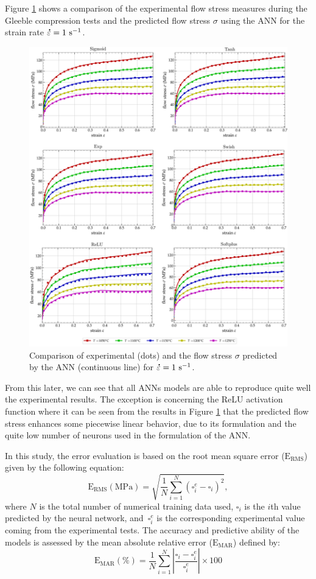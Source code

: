 \documentclass[algorithms,article,submit,pdftex,moreauthors]{Definitions/mdpi}
\DeclareRobustCommand{\mdot}[1]{\accentset{\mbox{\bfseries .}}{#1}}
\DeclareRobustCommand{\RMSE}{\text{E}_\text{RMS}}
\DeclareRobustCommand{\MARE}{\text{E}_\text{MAR}}
\DeclareRobustCommand{\ps}{\text{s}^{-1}}
\DeclareRobustCommand{\MPa}{\text{MPa}}
\begin{document}
Figure \ref{fig:ANNFit} shows a comparison of the experimental flow stress measures during the Gleeble compression tests and the predicted flow stress $\sigma$ using the ANN for the strain rate $\mdot{\varepsilon}=1~\ps$. 
\begin{figure}[h]
\centering
\includegraphics[width=0.95\columnwidth]{Figures/ANN-fit}
\caption{Comparison of experimental (dots) and the flow stress $\sigma$ predicted by the ANN (continuous line) for $\mdot{\varepsilon}=1~\ps$.}
\label{fig:ANNFit}
\end{figure}
From this later, we can see that all ANNs models are able to reproduce quite well the experimental results. The exception is concerning the ReLU activation function where it can be seen from the results in Figure \ref{fig:ANNFit} that the predicted flow stress enhances some piecewise linear behavior, due to its formulation and the quite low number of neurons used in the formulation of the ANN.

In this study, the error evaluation is based on the root mean square error ($\RMSE$) given by the following equation:
\begin{equation}
\RMSE (\MPa) = \sqrt{\frac{1}{N} \sum_{i=1}^{N} \left(\square_i^e - \square_i\right)^2}, \label{eq:RMSE}
\end{equation}
where $N$ is the total number of numerical training data used, $\square_i$ is the $i$th value predicted by the neural network, and~$\square_i^e$ is the corresponding experimental value coming from the experimental tests.
The accuracy and predictive ability of the models is assessed by the mean absolute relative error ($\MARE$) defined by:
\begin{equation}
\MARE(\%) = \frac{1}{N} \sum_{i=1}^{N}{\left|\frac{\square_i -\square_i^e}{\square_i^e}\right|} \times 100 \label{eq:AARE}
\end{equation}
\end{document}
